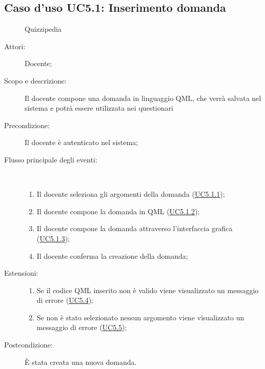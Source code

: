 \subsection{Caso d'uso UC5.1: Inserimento domanda}
	\begin{figure}[H]
		\centering
		\begin{resizedtikzpicture}{\textwidth}
		\begin{umlsystem}[x=0, fill=lightgray!20]{Quizzipedia}
		\end{umlsystem}
		\end{resizedtikzpicture}
		\caption{}
	\end{figure}
\begin{description}
\item[Attori:] Docente;
\item[Scopo e descrizione:] Il docente compone una domanda in linguaggio QML, che verrà salvata nel sistema e potrà essere utilizzata nei questionari
      \item[Precondizione:] Il docente è autenticato nel sistema;

        \item[Flusso principale degli eventi:] \ 
 \begin{enumerate}
          \item Il docente seleziona gli argomenti della domanda (\hyperlink{UC5.1.1}{UC5.1.1});
          \item Il docente compone la domanda in QML  (\hyperlink{UC5.1.2}{UC5.1.2});
          \item Il docente compone la domanda attraverso l'interfaccia grafica (\hyperlink{UC5.1.3}{UC5.1.3});
          \item Il docente conferma la creazione della domanda;

      \end{enumerate}
    \item[Estensioni:]
      \begin{enumerate}
          \item Se il codice QML inserito non è valido viene visualizzato un messaggio di errore (\hyperlink{UC5.4}{UC5.4});
          \item Se non è stato selezionato nessun argomento viene visualizzato un messaggio di errore (\hyperlink{UC5.5}{UC5.5});

      \end{enumerate}
    \item[Postcondizione:] È stata creata una nuova domanda.
  \end{description}
\hypertarget{UC5.1.1}{}
